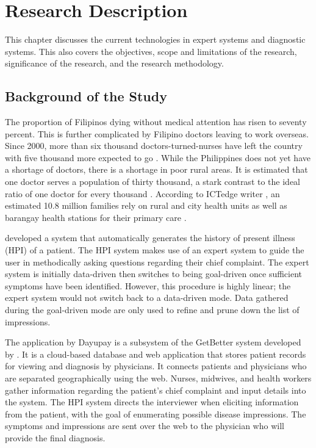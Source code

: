 %
%
%                 

\chapter{Research Description}
\label{sec:researchdesc}
This chapter discusses the current technologies in expert systems and diagnostic systems.
This also covers the objectives, scope and limitations of the research, significance of the research, and the research methodology.

\section{Background of the Study}
\label{sec:overview}
The proportion of Filipinos dying without medical attention has risen to seventy percent.
This is further complicated by Filipino doctors leaving to work overseas.
Since 2000, more than six thousand doctors-turned-nurses have left the country with five thousand more expected to go \cite{Harden:2008}.
While the Philippines does not yet have a shortage of doctors, there is a shortage in poor rural areas.
It is estimated that one doctor serves a population of thirty thousand, a stark contrast to the ideal ratio of one doctor for every thousand \cite{Manongdo:2014}.
According to ICTedge writer , an estimated 10.8 million families rely on rural and city health units as well as barangay health stations for their primary care . 

 developed a system that automatically generates the history of present illness (HPI) of a patient.
The HPI system makes use of an expert system to guide the user in methodically asking questions regarding their chief complaint. 
The expert system is initially data-driven then switches to being goal-driven once sufficient symptoms have been identified.
However, this procedure is highly linear; the expert system would not switch back to a data-driven mode.
Data gathered during the goal-driven mode are only used to refine and prune down the list of impressions.

The application by Dayupay is a subsystem of the GetBetter system developed by .
It is a cloud-based database and web application that stores patient records for viewing and diagnosis by physicians.
It connects patients and physicians who are separated geographically using the web.
Nurses, midwives, and health workers gather information regarding the patient's chief complaint and input details into the system.
The HPI system directs the interviewer when eliciting information from the patient, with the goal of enumerating possible disease impressions.
The symptoms and impressions are sent over the web to the physician who will provide the final diagnosis.    

